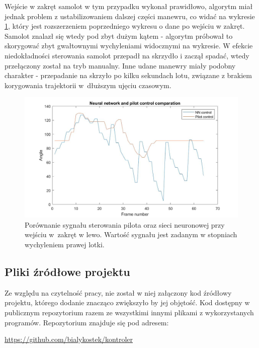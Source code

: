 \documentclass[12pt, a4paper]{article}
\begin{document}
Wejście w zakręt samolot w tym przypadku wykonał prawidłowo, algorytm miał jednak problem z ustabilizowaniem dalszej części manewru, co widać na wykresie \ref{fig:nnturn2}, który jest rozszerzeniem poprzedniego wykresu o dane po wejściu w zakręt. Samolot znalazł się wtedy pod zbyt dużym kątem - algorytm próbował to skorygować zbyt gwałtownymi wychyleniami widocznymi na wykresie. W efekcie niedokładności sterowania samolot przepadł na skrzydło i zaczął spadać, wtedy przełączony został na tryb manualny. Inne udane manewry miały podobny charakter - przepadanie na skrzyło po kilku sekundach lotu, związane z brakiem korygowania trajektorii w~dłuższym ujęciu czasowym.



 \begin{figure}[H]
    \centering
    \includegraphics[width=1\textwidth]{nnturn2}
    \caption{Porównanie sygnału sterowania pilota oraz sieci neuronowej przy wejściu w~zakręt w lewo. Wartość sygnału jest zadanym w stopniach wychyleniem prawej lotki.}
    \label{fig:nnturn2}
\end{figure}
\FloatBarrier



\subsection{Pliki źródłowe projektu}
Ze względu na czytelność pracy, nie został w niej załączony kod źródłowy projektu, którego dodanie znacząco zwiększyło by jej objętość. Kod dostępny w publicznym repozytorium razem ze wszystkimi innymi plikami z wykorzystanych programów. Repozytorium znajduje się pod adresem:

\begin{center}
\url{https://github.com/bialykostek/kontroler}
\end{center}
\end{document}
